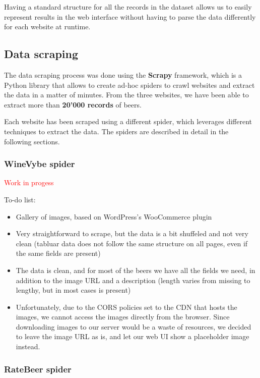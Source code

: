 Having a standard structure for all the records in the dataset allows us to easily represent results in the web interface without having to parse the data differently for each website at runtime.

\subsection{Data scraping}
\label{sec:data-scraping}

The data scraping process was done using the \textbf{Scrapy} framework, which is a Python library that allows to create ad-hoc spiders to crawl websites and extract the data in a matter of minutes. From the three websites, we have been able to extract more than \textbf{20'000 records} of beers.

Each website has been scraped using a different spider, which leverages different techniques to extract the data. The spiders are described in detail in the following sections.

\subsubsection{WineVybe spider}

\textcolor{red}{Work in progess}

To-do list:

\begin{itemize}
  \item Gallery of images, based on WordPress's WooCommerce plugin
  \item Very straightforward to scrape, but the data is a bit shuffeled and not very clean (tabluar data does not follow the same structure on all pages, even if the same fields are present)
  \item The data is clean, and for most of the beers we have all the fields we need, in addition to the image URL and a description (length varies from missing to lengthy, but in most cases is present)
  \item Unfortunately, due to the CORS policies set to the CDN that hosts the images, we cannot access the images directly from the browser. Since downloading images to our server would be a waste of resources, we decided to leave the image URL as is, and let our web UI show a placeholder image instead.
\end{itemize}

\subsubsection{RateBeer spider}

